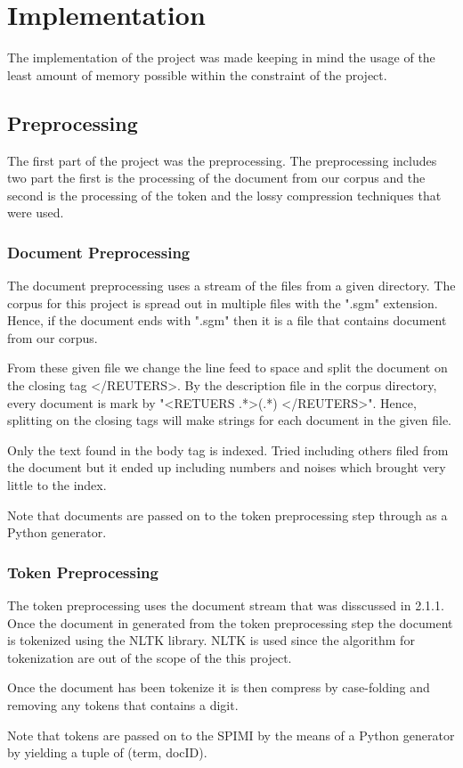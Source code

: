 \chapter{Implementation}

The implementation of the project was made keeping in mind the usage of the least amount of memory possible within the constraint of the project.

\section{Preprocessing}

\par The first part of the project was the preprocessing. The preprocessing includes two part the first is the processing of the document from our corpus and the second is the processing of the token and the lossy compression techniques that were used.

\subsection{Document Preprocessing}

\par The document preprocessing uses a stream of the files from a given directory. The corpus for this project is spread out in multiple files with the ".sgm" extension. Hence, if the document ends with ".sgm" then it is a file that contains document from our corpus. 
\par From these given file we change the line feed to space and split the document on the closing tag \textless/REUTERS\textgreater. By the description file in the corpus directory, every document is mark by "\textless RETUERS .*\textgreater (.*) \textless/REUTERS\textgreater". Hence, splitting on the closing tags will make strings for each document in the given file. 
\par Only the text found in the body tag is indexed. Tried including others filed from the document but it ended up including numbers and noises which brought very little to the index.
\par Note that documents are passed on to the token preprocessing step through as a Python generator.

\subsection{Token Preprocessing}

\par The token preprocessing uses the document stream that was disscussed in 2.1.1. Once the document in generated from the token preprocessing step the document is tokenized using the NLTK library. NLTK is used since the algorithm for tokenization are out of the scope of the this project.
\par Once the document has been tokenize it is then compress by case-folding and removing any tokens that contains a digit.
\par Note that tokens are passed on to the SPIMI by the means of a Python generator by yielding a tuple of (term, docID).

